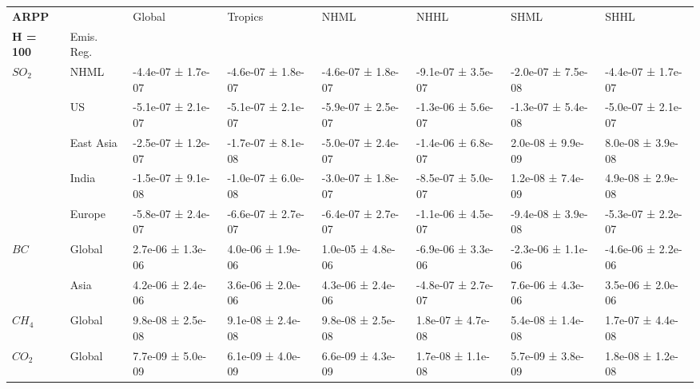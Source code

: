 \documentclass[preview]{standalone}
\newcommand{\nm}{\phantom{-}}
\begin{document}
	\tiny
	\begin{minipage}{\textwidth}
		\setlength\tabcolsep{5pt}
		\begin{tabular}{llllllll}
			\toprule
			\textbf{ARPP}       &        &               Global &              Tropics &                 NHML &                 NHHL &                 SHML &                 SHHL \\
			\textbf{H = 100} & Emis. Reg. &                      &                      &                      &                      &                      &                      \\
			\midrule
$SO_2$ & NHML &  -4.4e-07 ±  1.7e-07 &  -4.6e-07 ±  1.8e-07 &  -4.6e-07 ±  1.8e-07 &  -9.1e-07 ±  3.5e-07 &  -2.0e-07 ±  7.5e-08 &  -4.4e-07 ±  1.7e-07 \\
       & US &  -5.1e-07 ±  2.1e-07 &  -5.1e-07 ±  2.1e-07 &  -5.9e-07 ±  2.5e-07 &  -1.3e-06 ±  5.6e-07 &  -1.3e-07 ±  5.4e-08 &  -5.0e-07 ±  2.1e-07 \\
       & East Asia &  -2.5e-07 ±  1.2e-07 &  -1.7e-07 ±  8.1e-08 &  -5.0e-07 ±  2.4e-07 &  -1.4e-06 ±  6.8e-07 &   \nm2.0e-08 ±  9.9e-09 &   \nm8.0e-08 ±  3.9e-08 \\
       & India &  -1.5e-07 ±  9.1e-08 &  -1.0e-07 ±  6.0e-08 &  -3.0e-07 ±  1.8e-07 &  -8.5e-07 ±  5.0e-07 &   \nm1.2e-08 ±  7.4e-09 &   \nm4.9e-08 ±  2.9e-08 \\
       & Europe &  -5.8e-07 ±  2.4e-07 &  -6.6e-07 ±  2.7e-07 &  -6.4e-07 ±  2.7e-07 &  -1.1e-06 ±  4.5e-07 &  -9.4e-08 ±  3.9e-08 &  -5.3e-07 ±  2.2e-07 \\
\cmidrule(lr){1-8}
$BC$ & Global &   \nm2.7e-06 ±  1.3e-06 &   \nm4.0e-06 ±  1.9e-06 &   \nm1.0e-05 ±  4.8e-06 &  -6.9e-06 ±  3.3e-06 &  -2.3e-06 ±  1.1e-06 &  -4.6e-06 ±  2.2e-06 \\
       & Asia &   \nm4.2e-06 ±  2.4e-06 &   \nm3.6e-06 ±  2.0e-06 &   \nm4.3e-06 ±  2.4e-06 &  -4.8e-07 ±  2.7e-07 &   \nm7.6e-06 ±  4.3e-06 &   \nm3.5e-06 ±  2.0e-06 \\
\cmidrule(lr){1-8}
$CH_4$ & Global &   \nm9.8e-08 ±  2.5e-08 &   \nm9.1e-08 ±  2.4e-08 &   \nm9.8e-08 ±  2.5e-08 &   \nm1.8e-07 ±  4.7e-08 &   \nm5.4e-08 ±  1.4e-08 &   \nm1.7e-07 ±  4.4e-08 \\
\cmidrule(lr){1-8}
$CO_2$ & Global &   \nm7.7e-09 ±  5.0e-09 &   \nm6.1e-09 ±  4.0e-09 &   \nm6.6e-09 ±  4.3e-09 &   \nm1.7e-08 ±  1.1e-08 &   \nm5.7e-09 ±  3.8e-09 &   \nm1.8e-08 ±  1.2e-08 \\
\bottomrule
\end{tabular}

        \end{minipage}
        
\end{document}
